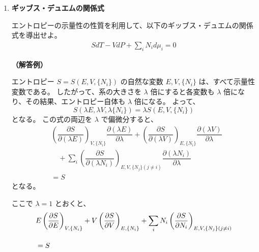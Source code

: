 \documentclass[uplatex,dvipdfmx,a4paper,11pt]{jsarticle}
\begin{document}
\begin{appendix}
\begin{enumerate}
\item
{\bf ギッブス・デュエムの関係式}

エントロピーの示量性の性質を利用して、以下のギッブス・デュエムの関係式を導出せよ。
\begin{align*}
S dT -V dP + \sum_i N_i d\mu_i = 0
\end{align*}

{\bf （解答例）}

エントロピー $S= S(E, V, \{N_i\})$ の自然な変数 $E, V, \{N_i\}$ は、すべて示量性変数である。
したがって、系の大きさを $\lambda$ 倍にすると各変数も $\lambda$ 倍になり、その結果、エントロピー自体も $\lambda$ 倍になる。
よって、
\begin{equation*}
S(\lambda E, \lambda V, \lambda \{N_i\}) = \lambda S(E, V, \{N_i\}) 
\end{equation*}
となる。
この式の両辺を $\lambda$ で偏微分すると、
\begin{align*}
& \left(\dfrac{\partial S}{\partial (\lambda E)} \right)_{V, \{N_i\}} \dfrac{\partial (\lambda E)}{\partial \lambda} + \left(\dfrac{\partial S}{\partial (\lambda V)} \right)_{E, \{N_i\}} \dfrac{\partial (\lambda V)}{\partial \lambda} \\[10pt]
	&\quad + \sum_i \left(\dfrac{\partial S}{\partial (\lambda N_i)} \right)_{E, V, \{N_j\}(j \neq i)} \dfrac{\partial (\lambda N_i)}{\partial \lambda} \\[10pt]
&= S
\end{align*}
となる。

ここで $\lambda=1$ とおくと、
\begin{align}
&E\left(\dfrac{\partial S}{\partial E} \right)_{V, \{N_i\}} 
+ V\left(\dfrac{\partial S}{\partial V} \right)_{E, \{N_i\}} + \sum_i N_i \left(\dfrac{\partial S}{\partial N_i} \right)_{E, V, \{N_j\}(j \neq i)} \notag \\[10pt]
&= S
\label{eq:lambda1}
\end{align}


\end{enumerate}
\end{appendix}
\end{document}
